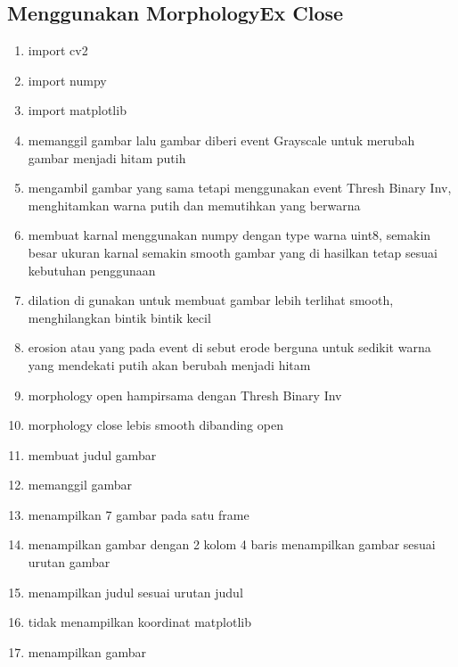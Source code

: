 \subsection{Menggunakan MorphologyEx Close}

\begin{enumerate}
	\item import cv2
	\item import numpy
	\item import matplotlib
	\item memanggil gambar lalu gambar diberi event Grayscale untuk merubah gambar menjadi hitam putih
	\item mengambil gambar yang sama tetapi menggunakan event Thresh Binary Inv, menghitamkan warna putih dan memutihkan yang berwarna
	\item membuat karnal menggunakan numpy dengan type warna uint8, semakin besar ukuran karnal semakin smooth gambar yang di hasilkan tetap sesuai kebutuhan penggunaan
	\item dilation di gunakan untuk membuat gambar lebih terlihat smooth, menghilangkan bintik bintik kecil
	\item erosion atau yang pada event di sebut erode berguna untuk sedikit warna yang mendekati putih akan berubah menjadi hitam
	\item morphology open hampirsama dengan Thresh Binary Inv
	\item morphology close lebis smooth dibanding open
	\item membuat judul gambar
	\item memanggil gambar
	\item menampilkan 7 gambar pada satu frame
	\item menampilkan gambar dengan 2 kolom 4 baris menampilkan gambar sesuai urutan gambar
	\item menampilkan judul sesuai urutan judul
	\item tidak menampilkan koordinat matplotlib
	\item menampilkan gambar
\end{enumerate}

